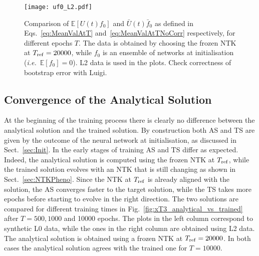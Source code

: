 \begin{figure}[t!]
  \centering
  \texttt{[image: uf0\_L2.pdf]}
  \caption{Comparison of $\mathbb{E}\left[U(t) f_{0}\right]$ and $\bar{U}(t)
    \bar{f}_{0}$ as defined in Eqs.~\eqref{eq:MeanValAtT}
    and~\eqref{eq:MeanValAtTNoCorr} respectively, for different epochs $T$. The
    data is obtained by choosing the frozen NTK at $T_{\rm ref} = 20000$, while
    $f_0$ is an ensemble of networks at initialisation (\textit{i.e.}\
    $\mathbb{E}[f_0]=0$). L2 data is used in the plots. \ac{Check correctness of
    bootstrap error with Luigi.}}
    \label{fig:xT3_exp_val}
  \end{figure}

\FloatBarrier

\subsection{Convergence of the Analytical Solution}

At the beginning of the training process there is clearly no difference between
the analytical solution and the trained solution. By construction both AS and TS
are given by the outcome of the neural network at initialisation, as discussed
in Sect.~\ref{sec:Init}. In the early stages of training AS and TS differ as
expected. Indeed, the analytical solution is computed using the frozen NTK at
$T_{\rm ref}$, while the trained solution evolves with an NTK that is still
changing as shown in Sect.~\ref{sec:NTKPheno}. Since the NTK at $T_{\rm ref}$ is
already aligned with the solution, the AS converges faster to the target
solution, while the TS takes more epochs before starting to evolve in the right
direction. The two solutions are compared for different training times in
Fig.~\ref{fig:xT3_analytical_vs_trained} after $T=500, 1000$ and 10000 epochs.
The plots in the left column correspond to synthetic L0 data, while the ones in
the right column are obtained using L2 data. The analytical solution is obtained
using a frozen NTK at $T_{\rm ref}=20000$. In both cases the analytical solution
agrees with the trained one for $T=10000$.

